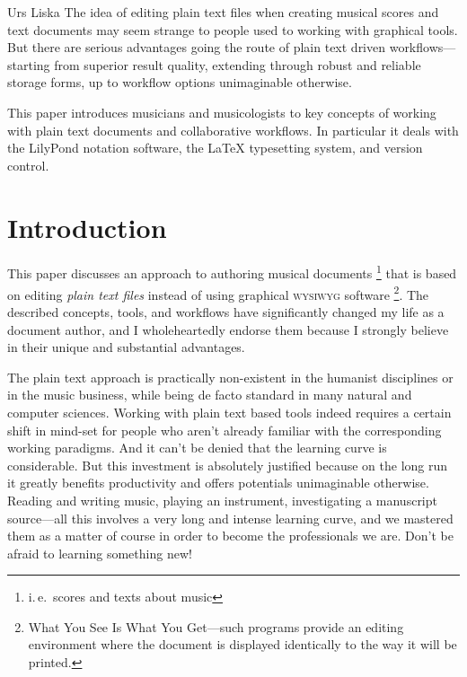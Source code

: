 \documentclass[../../LilyPond-Tutorials]{subfiles}
\begin{document}
\begin{authorAbstract}{Urs Liska}
The idea of editing plain text files when creating musical scores
and text documents may seem strange to people used to working
with graphical tools.
But there are serious advantages going the route of plain text
driven workflows---starting from superior result quality,
extending through robust and reliable storage forms, up to
workflow options unimaginable otherwise.

This paper introduces musicians and musicologists to key concepts
of working with plain text documents and collaborative workflows.
In particular it deals with the LilyPond notation software, the
\LaTeX{} typesetting system, and version control.

\end{authorAbstract}

\chapter*{Introduction}
\label{chap:pt_introduction}
This paper discusses an approach to authoring musical documents%
\footnote{i.\,e.\ scores and texts about music}
that is based on editing \emph{plain text files} instead of using
graphical \textsc{wysiwyg} software%
\footnote{What You See Is What You Get---such programs provide an
editing environment where the document is displayed identically
to the way it will be printed.}.
The described concepts, tools, and workflows have significantly
changed my life as a document author, and I  wholeheartedly
endorse them because I strongly believe in their unique and
substantial advantages.

The plain text approach is practically non-existent in the
humanist disciplines or in the music business, while being de
facto standard in many natural and computer sciences.
Working with plain text based tools indeed requires a certain
shift in mind-set for people who aren't already familiar with the
corresponding working paradigms.
And it can't be denied that the learning curve is considerable.
But this investment is absolutely justified because on the long
run it greatly benefits productivity and offers potentials
unimaginable otherwise.
Reading and writing music, playing an instrument, investigating a
manuscript source---all this involves a very long and intense
learning curve, and we mastered them as a matter of course in
order to become the professionals we are.
Don't be afraid to learning something new!
\end{document}
